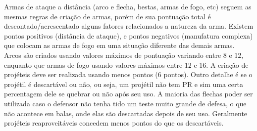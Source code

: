 

Armas de ataque a distância (arco e flecha, bestas, armas de fogo, etc) seguem as mesmas regras de criação de armas, porém de sua pontuação total é descontado/acrescentado alguns fatores relacionados a natureza da arma. Existem pontos positivos (distância de ataque), e pontos negativos (manufatura complexa) que colocam as armas de fogo em uma situação diferente das demais armas. Arcos são criados usando valores máximos de pontuação variando entre 8 e 12, enquanto que armas de fogo usando valores máximos entre 12 e 16. A criação de projéteis deve ser realizada usando menos pontos (6 pontos). Outro detalhe é se o projétil é descartável ou não, ou seja, um projétil não tem PR e sim uma certa percentagem dele se quebrar ou não após seu uso. A maioria das flechas poder ser utilizada caso o defensor não tenha tido um teste muito grande de defesa, o que não acontece em balas, onde elas são descartadas depois de seu uso. Geralmente projéteis reaproveitáveis concedem menos pontos do que os descartáveis.

